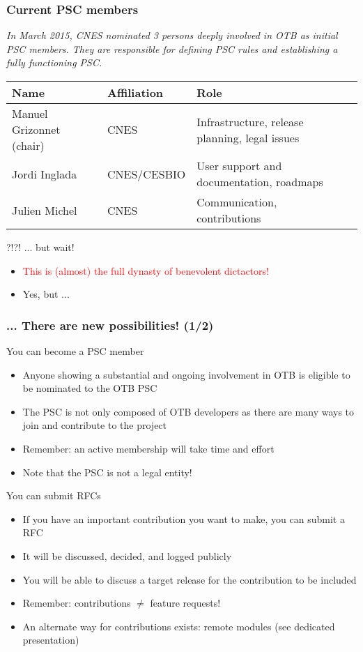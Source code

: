 \documentclass[8pt]{beamer}
\begin{document}
\begin{frame}
\frametitle{Current PSC members}
\textit{In March 2015, CNES nominated 3 persons deeply involved in OTB as initial PSC members. They are responsible for defining PSC rules and establishing a fully functioning PSC.}
\vspace{0.5cm}
\begin{small}
\begin{tabular}{|l|l|l|l|}
\hline
\textbf{Name} 	&\textbf{Affiliation}	&\textbf{Role}\\
\hline
Manuel Grizonnet (chair) &	CNES  &	Infrastructure, release planning, legal issues\\
Jordi Inglada 	&CNES/CESBIO 		&User support and documentation, roadmaps\\
Julien Michel 	&CNES &	Communication, contributions \\
\hline
\end{tabular}
\end{small}

\begin{block}{?!?! ... but wait!}
\begin{itemize}
\item \textcolor{red}{This is (almost) the full dynasty of benevolent dictactors!}
\item Yes, but ...
\end{itemize}
\end{block}
\end{frame}

\begin{frame}
\frametitle{... There are new possibilities! (1/2)}

\begin{block}{You can become a PSC member}
\begin{itemize}
\item Anyone showing a substantial and ongoing involvement in OTB is eligible to be nominated to the OTB PSC
\item The PSC is not only composed of OTB developers as there are many ways to join and contribute to the project
\item Remember: an active membership will take time and effort
\item Note that the PSC is not a legal entity!
\end{itemize}
\end{block}

\begin{block}{You can submit RFCs}
\begin{itemize}
\item If you have an important contribution you want to make, you can submit a RFC
\item It will be discussed, decided, and logged publicly
\item You will be able to discuss a target release for the contribution to be included
\item Remember: contributions $\neq$ feature requests!
\item An alternate way for contributions exists: remote modules (see dedicated presentation)
\end{itemize}
\end{block}
\end{frame}
\end{document}
